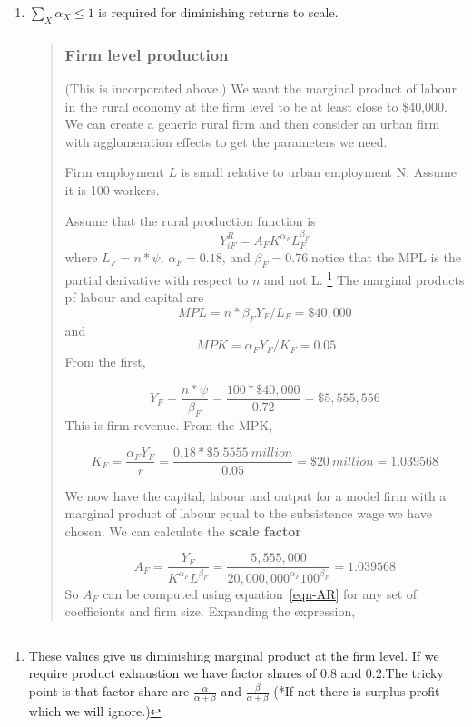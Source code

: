 \begin{enumerate}
\item $\sum_X \alpha_X \le 1$ is required for diminishing returns to scale. 




\begin{quotation} \color{orange}
\subsubsection{Firm level production}   
(This is incorporated above.) We want the marginal product of labour in the rural economy at the firm level to be at least close to \$40,000.  We can create a generic rural firm and then consider an urban firm with agglomeration effects to get the parameters we need. 

Firm employment $L$ is small relative to  urban employment {N}. Assume it is 100 workers. 

Assume that the rural production function is 
\[ Y_{iF}^R=A_{F} K^{\alpha_F} L_F^{\beta_F} \]
where  $L_F=n*\psi$, $\alpha_F=0.18 $,  and $\beta_F=0.76$.notice that the MPL is the partial derivative with respect to $n$ and not L. 
\footnote{These values give us diminishing marginal product at the firm level. If we require product exhaustion we have factor shares of  0.8 and 0.2.The tricky point is that factor share are 
 $\frac{\alpha}{\alpha + \beta}$ and $\frac{\beta}{\alpha + \beta}$
(*If not there is surplus profit  which we will ignore.)}   
The marginal products pf labour and capital are 
\[MPL=n*\beta_F Y_F/L_F=\$40,000\] and\[\ MPK=\alpha_F Y_F/K_F =0.05\]
From the first, 

\[Y_F=\frac{n*\psi}{\beta_F}=\frac{100*\$40,000}{0.72}=\$5,555,556\]
This is firm revenue. From the MPK, 

\[K_F=  \frac{\alpha_F Y_F }{r}=\frac{0.18 *\$5.5555\ million}{0.05} =\$20\ million = 1.039568 \]

We now have the capital, labour and output for a model firm with a marginal product of labour  equal to the subsistence wage we have chosen. We can calculate the \textbf{scale factor} 

\begin{equation}  
A_F= \frac{Y_F}{K^{\alpha_F} L^{\beta_F}}=\frac{5,555,000}{20,000,000^{\alpha_F} 100^{\beta_F}} = 1.039568 \label{eqn-AR}\end{equation} 
So $A_F$ can be computed using equation~\ref{eqn-AR} for any set of coefficients and firm size. Expanding the expression,


\end{quotation}
\end{enumerate}
